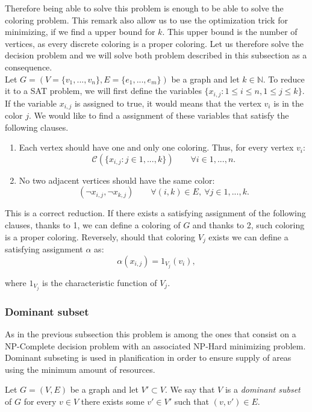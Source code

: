 Therefore being able to solve this problem is enough to be able to solve the coloring problem. This remark also allow us to use the optimization trick for minimizing, if we find a upper bound for $k$. This upper bound  is the number of vertices, as every discrete coloring is a proper coloring. Let us therefore solve the decision problem and we will solve both problem described in this subsection as a consequence.\\

Let $G=(V=\{ v_1,...,v_n\},E= \{e_1,...,e_m\})$ be a graph and let $k\in \mathbb{N}$. To reduce it to a SAT problem, we will first define the variables $\{x_{i,j} : 1\le i \le n,  1 \le j \le k\}$. If the variable $x_{i,j}$ is assigned to true, it would means that the vertex $v_i$ is in the color $j$. We would like to find a assignment of these variables that satisfy the following clauses.
\begin{enumerate}
\item Each vertex should have one and only one coloring. Thus, for every vertex $v_i$:
  $$\mathcal{C}( \{x_{i,j} : j \in 1,...,k \}) \qquad \forall i \in 1,...,n.$$
\item No two adjacent vertices should have the same color:
$$(\neg x_{i,j}, \neg x_{k,j}) \qquad \forall (i,k) \in E,\ \forall j \in 1,...,k.$$
\end{enumerate}

This is a correct reduction. If there exists a satisfying assignment of the following clauses, thanks to 1, we can define a coloring of $G$ and thanks to 2, such coloring is a proper coloring. Reversely, should that coloring $V_j$ exists we can define a satisfying assignment $\alpha$ as:
$$\alpha(x_{i,j}) = 1_{V_j} (v_i),$$

where $1_{V_j}$ is the characteristic function of $V_j$.


\subsubsection{Dominant subset}

As in the previous subsection this problem is among the ones that consist on a NP-Complete decision problem with an associated NP-Hard minimizing problem. Dominant subseting is used in planification in order to ensure supply of areas using the minimum amount of resources. 

\begin{definition}
  Let $G=(V,E)$ be a graph and let $V' \subset V$. We say that $V$ is a \emph{dominant subset} of $G$ for every $v\in V$ there exists some $v'\in V' $ such that $(v,v')\in E$.
\end{definition}


